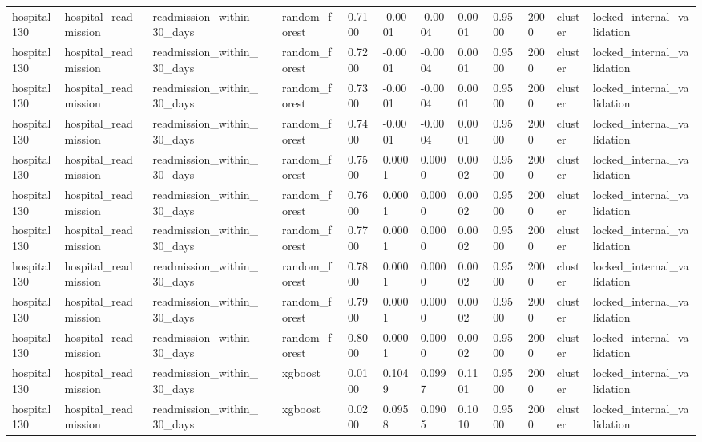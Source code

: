 \begin{tabular}{lllllllllllll}
hospital130 & hospital\_readmission & readmission\_within\_30\_days &  & random\_forest & 0.7100 & -0.0001 & -0.0004 & 0.0001 & 0.9500 & 2000 & cluster & locked\_internal\_validation \\
hospital130 & hospital\_readmission & readmission\_within\_30\_days &  & random\_forest & 0.7200 & -0.0001 & -0.0004 & 0.0001 & 0.9500 & 2000 & cluster & locked\_internal\_validation \\
hospital130 & hospital\_readmission & readmission\_within\_30\_days &  & random\_forest & 0.7300 & -0.0001 & -0.0004 & 0.0001 & 0.9500 & 2000 & cluster & locked\_internal\_validation \\
hospital130 & hospital\_readmission & readmission\_within\_30\_days &  & random\_forest & 0.7400 & -0.0001 & -0.0004 & 0.0001 & 0.9500 & 2000 & cluster & locked\_internal\_validation \\
hospital130 & hospital\_readmission & readmission\_within\_30\_days &  & random\_forest & 0.7500 & 0.0001 & 0.0000 & 0.0002 & 0.9500 & 2000 & cluster & locked\_internal\_validation \\
hospital130 & hospital\_readmission & readmission\_within\_30\_days &  & random\_forest & 0.7600 & 0.0001 & 0.0000 & 0.0002 & 0.9500 & 2000 & cluster & locked\_internal\_validation \\
hospital130 & hospital\_readmission & readmission\_within\_30\_days &  & random\_forest & 0.7700 & 0.0001 & 0.0000 & 0.0002 & 0.9500 & 2000 & cluster & locked\_internal\_validation \\
hospital130 & hospital\_readmission & readmission\_within\_30\_days &  & random\_forest & 0.7800 & 0.0001 & 0.0000 & 0.0002 & 0.9500 & 2000 & cluster & locked\_internal\_validation \\
hospital130 & hospital\_readmission & readmission\_within\_30\_days &  & random\_forest & 0.7900 & 0.0001 & 0.0000 & 0.0002 & 0.9500 & 2000 & cluster & locked\_internal\_validation \\
hospital130 & hospital\_readmission & readmission\_within\_30\_days &  & random\_forest & 0.8000 & 0.0001 & 0.0000 & 0.0002 & 0.9500 & 2000 & cluster & locked\_internal\_validation \\
hospital130 & hospital\_readmission & readmission\_within\_30\_days &  & xgboost & 0.0100 & 0.1049 & 0.0997 & 0.1101 & 0.9500 & 2000 & cluster & locked\_internal\_validation \\
hospital130 & hospital\_readmission & readmission\_within\_30\_days &  & xgboost & 0.0200 & 0.0958 & 0.0905 & 0.1010 & 0.9500 & 2000 & cluster & locked\_internal\_validation \\

\end{tabular}
